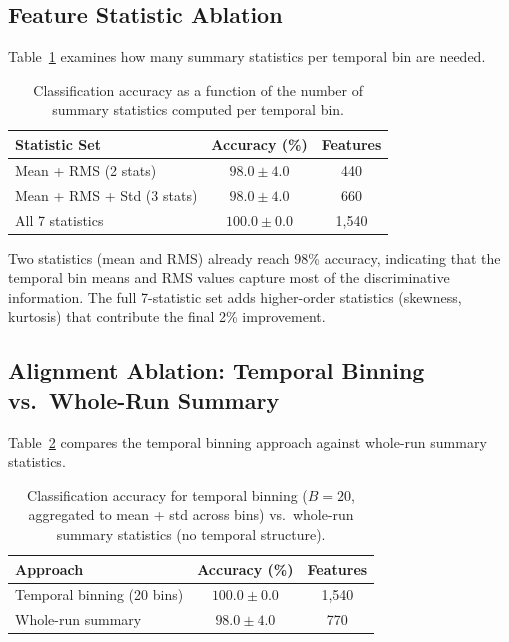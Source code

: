 \subsection{Feature Statistic Ablation}

Table~\ref{tab:stat_ablation} examines how many summary statistics per temporal bin are needed.

\begin{table}[H]
\caption{Classification accuracy as a function of the number of summary statistics computed per temporal bin.}\label{tab:stat_ablation}
\centering
\begin{tabular}{lcc}
\toprule
\textbf{Statistic Set} & \textbf{Accuracy (\%)} & \textbf{Features} \\
\midrule
Mean + RMS (2 stats)             & $98.0 \pm 4.0$ & 440 \\
Mean + RMS + Std (3 stats)       & $98.0 \pm 4.0$ & 660 \\
All 7 statistics                 & $100.0 \pm 0.0$ & 1{,}540 \\
\bottomrule
\end{tabular}
\end{table}

Two statistics (mean and RMS) already reach 98\% accuracy, indicating that the temporal bin means and RMS values capture most of the discriminative information. The full 7-statistic set adds higher-order statistics (skewness, kurtosis) that contribute the final 2\% improvement.

\subsection{Alignment Ablation: Temporal Binning vs.\ Whole-Run Summary}

Table~\ref{tab:alignment_ablation} compares the temporal binning approach against whole-run summary statistics.

\begin{table}[H]
\caption{Classification accuracy for temporal binning ($B = 20$, aggregated to mean + std across bins) vs.\ whole-run summary statistics (no temporal structure).}\label{tab:alignment_ablation}
\centering
\begin{tabular}{lcc}
\toprule
\textbf{Approach} & \textbf{Accuracy (\%)} & \textbf{Features} \\
\midrule
Temporal binning (20 bins)  & $100.0 \pm 0.0$ & 1{,}540 \\
Whole-run summary           & $98.0 \pm 4.0$ & 770 \\
\bottomrule
\end{tabular}
\end{table}

